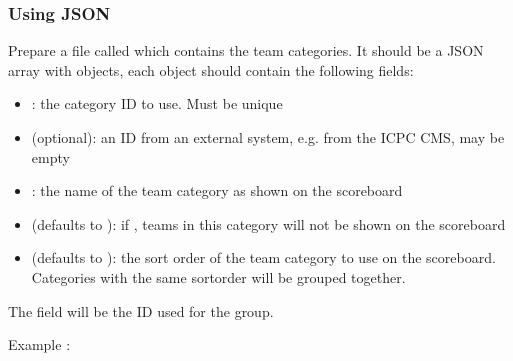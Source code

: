\documentclass[a4paper,10pt,english,openany]{sphinxmanual}
\begin{document}
\subsubsection{Using JSON}
\label{\detokenize{import:using-json}}
\sphinxAtStartPar
Prepare a file called  which contains the team categories.
It should be a JSON array with objects, each object should contain the following
fields:
\begin{itemize}
\item {} 
\sphinxAtStartPar
{}: the category ID to use. Must be unique

\item {} 
\sphinxAtStartPar
{} (optional): an ID from an external system, e.g. from the ICPC CMS, may be empty

\item {} 
\sphinxAtStartPar
{}: the name of the team category as shown on the scoreboard

\item {} 
\sphinxAtStartPar
{} (defaults to ): if , teams in this category will
not be shown on the scoreboard

\item {} 
\sphinxAtStartPar
{} (defaults to ): the sort order of the team category to use
on the scoreboard. Categories with the same sortorder will be grouped together.

\end{itemize}

\sphinxAtStartPar
The  field will be the ID used for the group.

\sphinxAtStartPar
Example :
\end{document}
